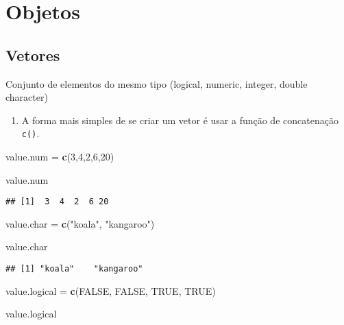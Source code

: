 \documentclass[]{article}
\newenvironment{Shaded}{\begin{snugshade}}{\end{snugshade}}
\newcommand{\KeywordTok}[1]{\textcolor[rgb]{0.13,0.29,0.53}{\textbf{#1}}}
\newcommand{\DecValTok}[1]{\textcolor[rgb]{0.00,0.00,0.81}{#1}}
\newcommand{\StringTok}[1]{\textcolor[rgb]{0.31,0.60,0.02}{#1}}
\newcommand{\OtherTok}[1]{\textcolor[rgb]{0.56,0.35,0.01}{#1}}
\newcommand{\NormalTok}[1]{#1}
\providecommand{\tightlist}{%
  \setlength{\itemsep}{0pt}\setlength{\parskip}{0pt}}
\begin{document}
\section{Objetos}\label{objetos}

\subsection{Vetores}\label{vetores}

Conjunto de elementos do mesmo tipo (logical, numeric, integer, double
character)

\begin{enumerate}
\def\labelenumi{\arabic{enumi}.}
\tightlist
\item
  A forma mais simples de se criar um vetor é usar a função de
  concatenação \texttt{c()}.
\end{enumerate}

\begin{Shaded}
\begin{Highlighting}[]
\NormalTok{value.num  =}\StringTok{ }\KeywordTok{c}\NormalTok{(}\DecValTok{3}\NormalTok{,}\DecValTok{4}\NormalTok{,}\DecValTok{2}\NormalTok{,}\DecValTok{6}\NormalTok{,}\DecValTok{20}\NormalTok{)}

\NormalTok{value.num}
\end{Highlighting}
\end{Shaded}

\begin{verbatim}
## [1]  3  4  2  6 20
\end{verbatim}

\begin{Shaded}
\begin{Highlighting}[]
\NormalTok{value.char =}\StringTok{ }\KeywordTok{c}\NormalTok{(}\StringTok{"koala"}\NormalTok{, }\StringTok{"kangaroo"}\NormalTok{)}

\NormalTok{value.char}
\end{Highlighting}
\end{Shaded}

\begin{verbatim}
## [1] "koala"    "kangaroo"
\end{verbatim}

\begin{Shaded}
\begin{Highlighting}[]
\NormalTok{value.logical =}\StringTok{ }\KeywordTok{c}\NormalTok{(}\OtherTok{FALSE}\NormalTok{, }\OtherTok{FALSE}\NormalTok{, }\OtherTok{TRUE}\NormalTok{, }\OtherTok{TRUE}\NormalTok{)}

\NormalTok{value.logical}
\end{Highlighting}
\end{Shaded}
\end{document}
